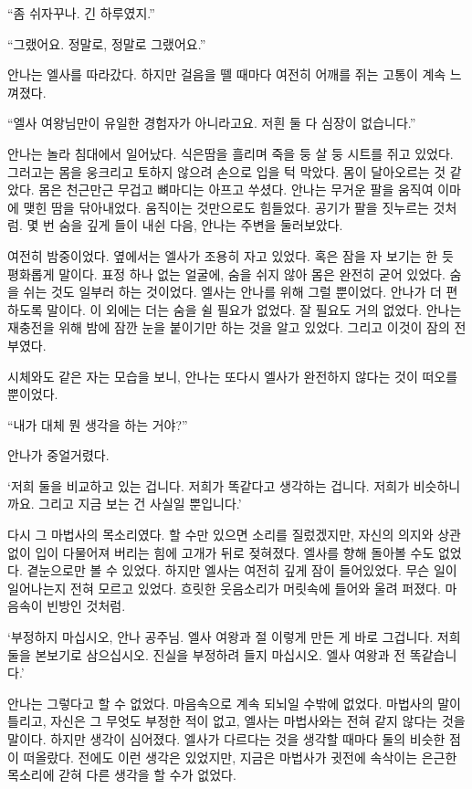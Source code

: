 ``좀 쉬자꾸나. 긴 하루였지.''

``그랬어요. 정말로, 정말로 그랬어요.''

안나는 엘사를 따라갔다. 하지만 걸음을 뗄 때마다 여전히 어깨를 쥐는 고통이 계속 느껴졌다.

\textbreak

\forceindent``엘사 여왕님만이 유일한 경험자가 아니라고요. 저흰 둘 다 심장이 없습니다.''

안나는 놀라 침대에서 일어났다. 식은땀을 흘리며 죽을 둥 살 둥 시트를 쥐고 있었다. 그러고는 몸을 웅크리고 토하지 않으려 손으로 입을 턱 막았다. 몸이 달아오르는 것 같았다. 몸은 천근만근 무겁고 뼈마디는 아프고 쑤셨다. 안나는 무거운 팔을 움직여 이마에 맺힌 땀을 닦아내었다. 움직이는 것만으로도 힘들었다. 공기가 팔을 짓누르는 것처럼. 몇 번 숨을 깊게 들이 내쉰 다음, 안나는 주변을 둘러보았다.

여전히 밤중이었다. 옆에서는 엘사가 조용히 자고 있었다. 혹은 잠을 자 보기는 한 듯 평화롭게 말이다. 표정 하나 없는 얼굴에, 숨을 쉬지 않아 몸은 완전히 굳어 있었다. 숨을 쉬는 것도 일부러 하는 것이었다. 엘사는 안나를 위해 그럴 뿐이었다. 안나가 더 편하도록 말이다. 이 외에는 더는 숨을 쉴 필요가 없었다. 잘 필요도 거의 없었다. 안나는 재충전을 위해 밤에 잠깐 눈을 붙이기만 하는 것을 알고 있었다. 그리고 이것이 잠의 전부였다.

시체와도 같은 자는 모습을 보니, 안나는 또다시 엘사가 완전하지 않다는 것이 떠오를 뿐이었다.

``내가 대체 뭔 생각을 하는 거야?''

안나가 중얼거렸다.

`저희 둘을 비교하고 있는 겁니다. 저희가 똑같다고 생각하는 겁니다. 저희가 비슷하니까요. 그리고 지금 보는 건 사실일 뿐입니다.'

다시 그 마법사의 목소리였다. 할 수만 있으면 소리를 질렀겠지만, 자신의 의지와 상관없이 입이 다물어져 버리는 힘에 고개가 뒤로 젖혀졌다. 엘사를 향해 돌아볼 수도 없었다. 곁눈으로만 볼 수 있었다. 하지만 엘사는 여전히 깊게 잠이 들어있었다. 무슨 일이 일어나는지 전혀 모르고 있었다. 흐릿한 웃음소리가 머릿속에 들어와 울려 퍼졌다. 마음속이 빈방인 것처럼.

`부정하지 마십시오, 안나 공주님. 엘사 여왕과 절 이렇게 만든 게 바로 그겁니다. 저희 둘을 본보기로 삼으십시오. 진실을 부정하려 들지 마십시오. 엘사 여왕과 전 똑같습니다.'

안나는 그렇다고 할 수 없었다. 마음속으로 계속 되뇌일 수밖에 없었다. 마법사의 말이 틀리고, 자신은 그 무엇도 부정한 적이 없고, 엘사는 마법사와는 전혀 같지 않다는 것을 말이다. 하지만 생각이 심어졌다. 엘사가 다르다는 것을 생각할 때마다 둘의 비슷한 점이 떠올랐다. 전에도 이런 생각은 있었지만, 지금은 마법사가 귓전에 속삭이는 은근한 목소리에 갇혀 다른 생각을 할 수가 없었다.

